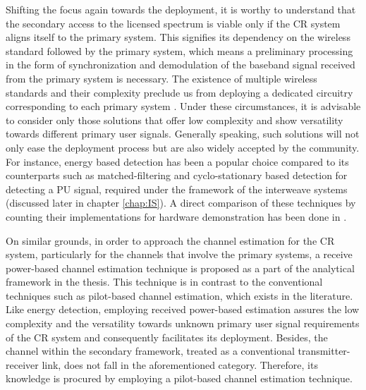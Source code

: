 Shifting the focus again towards the deployment, it is worthy to understand that the secondary access to the licensed spectrum is viable only if the CR system aligns itself to the primary system. This signifies its dependency on the wireless standard followed by the primary system, which means a preliminary processing in the form of synchronization and demodulation of the baseband signal received from the primary system is necessary. The existence of multiple wireless standards and their complexity preclude us from deploying a dedicated circuitry corresponding to each primary system \cite{Ghasemi08_cm}. Under these circumstances, it is advisable to consider only those solutions that offer low complexity and show versatility towards different primary user signals. Generally speaking, such solutions will not only ease the deployment process but are also widely accepted by the community. For instance, energy based detection has been a popular choice compared to its counterparts such as matched-filtering and cyclo-stationary based detection for detecting a PU signal, required under the framework of the interweave systems (discussed later in chapter \ref{chap:IS}). A direct comparison of these techniques by counting their implementations for hardware demonstration has been done in \cite{Pawe11}. 

On similar grounds, in order to approach the channel estimation for the CR system, particularly for the channels that involve the primary systems, a receive power-based channel estimation technique is proposed as a part of the analytical framework in the thesis. This technique is in contrast to the conventional techniques such as pilot-based channel estimation, which exists in the literature. Like energy detection, employing received power-based estimation assures the low complexity and the versatility towards unknown primary user signal requirements of the CR system and consequently facilitates its deployment. Besides, the channel within the secondary framework, treated as a conventional transmitter-receiver link, does not fall in the aforementioned category. Therefore, its knowledge is procured by employing a pilot-based channel estimation technique.


